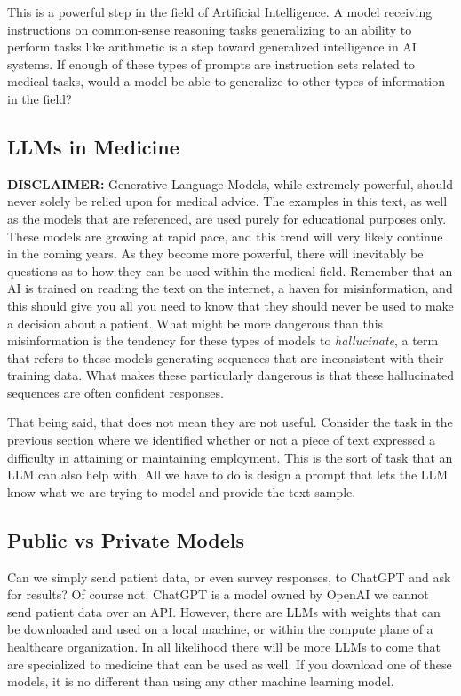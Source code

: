 This is a powerful step in the field of Artificial Intelligence. A model receiving instructions on common-sense reasoning tasks generalizing to an ability to perform tasks like arithmetic is a step
toward generalized intelligence in AI systems. If enough of these types of prompts are instruction sets related to medical tasks, would a model be able to generalize to other types of information in the field?

\subsection{LLMs in Medicine}
\textbf{DISCLAIMER:} Generative Language Models, while extremely powerful, should never solely be relied upon for medical advice. The examples in this text,
as well as the models that are referenced, are used purely for educational purposes only.
These models are growing at rapid pace, and this trend will very likely continue in the coming years. As they become more powerful, there
will inevitably be questions as to how they can be used within the medical field. Remember that an AI is trained on reading the text on the internet,
a haven for misinformation, and this should give you all you need to know that they should never be used to make a decision about a patient. What might be more dangerous than this
misinformation is the tendency for these types of models to \textit{hallucinate}, a term that refers to these models generating sequences that are inconsistent with their training data.
What makes these particularly dangerous is that these hallucinated sequences are often confident responses.

That being said, that does not mean they are not useful. Consider the task in the previous section where we identified whether or not a piece of text
expressed a difficulty in attaining or maintaining employment. This is the sort of task that an LLM can also help with. All we have to do
is design a prompt that lets the LLM know what we are trying to model and provide the text sample.

\subsection{Public vs Private Models}

Can we simply send patient data, or even survey responses, to ChatGPT and ask for results? Of course not. ChatGPT is a model owned by OpenAI we cannot send
patient data over an API. However, there are LLMs with weights that can be downloaded and used on a local machine, or within the compute plane of a healthcare
organization. In all likelihood there will be more LLMs to come that are specialized to medicine that can be used as well. If you download one of these models,
it is no different than using any other machine learning model.

